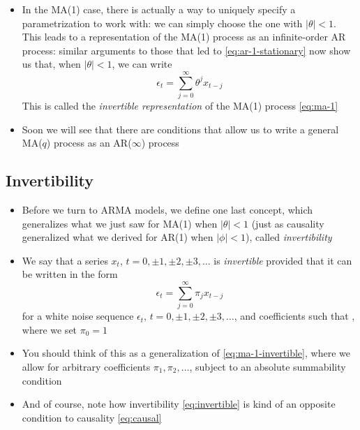 \documentclass{article}
\begin{document}
\begin{itemize}
\item In the MA(1) case, there is actually a way to uniquely specify a
  parametrization to work with: we can simply choose the one with $|\theta| < 
  1$. This leads to a representation of the MA(1) process as an infinite-order
  AR process: similar arguments to those that led to \eqref{eq:ar-1-stationary} 
  now show us that, when $|\theta| < 1$, we can write 
  \begin{equation}
  \label{eq:ma-1-invertible}
  \epsilon_t = \sum_{j=0}^\infty \theta^j x_{t-j} 
  \end{equation}
  This is called the \emph{invertible representation} of the MA(1) process
  \eqref{eq:ma-1} 

\item Soon we will see that there are conditions that allow us to write a
  general MA($q$) process as an AR($\infty$) process
\end{itemize}

\subsection{Invertibility}

\begin{itemize}
\item Before we turn to ARMA models, we define one last concept, which
  generalizes what we just saw for MA(1) when $|\theta| < 1$ (just as causality
  generalized what we derived for AR(1) when $|\phi| < 1$), called
  \emph{invertibility}  

\item We say that a series $x_t$, $t = 0, \pm 1, \pm 2, \pm 3, \dots$ is
  \emph{invertible} provided that it can be written in the form
  \begin{equation}
  \label{eq:invertible}
  \epsilon_t = \sum_{j=0}^\infty \pi_j x_{t-j}
  \end{equation}
  for a white noise sequence $\epsilon_t$, $t = 0, \pm 1, \pm 2, \pm 3, \dots$,
  and coefficients such that , where 
  we set $\pi_0 = 1$

\item You should think of this as a generalization of
  \eqref{eq:ma-1-invertible}, where we allow for arbitrary coefficients
  $\pi_1,\pi_2,\dots$, subject to an absolute summability condition   

\item And of course, note how invertibility \eqref{eq:invertible} is kind of an
  opposite condition to causality \eqref{eq:causal}  
\end{itemize}
\end{document}
